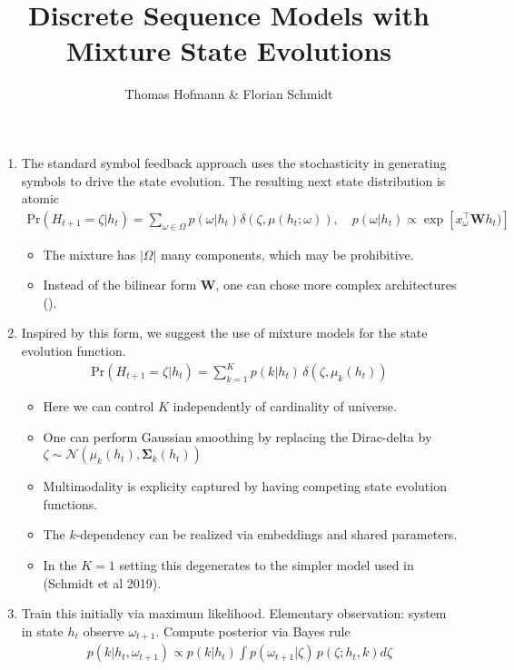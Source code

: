 \documentclass{article}
\author{Thomas Hofmann \& Florian Schmidt}
\title{Discrete Sequence Models with Mixture State Evolutions}
\newcommand{\mSigma}{{\mathbf \Sigma}}
\newcommand{\mW}{{\mathbf W}}
\begin{document}
\maketitle 
\begin{enumerate}
\item The standard symbol feedback approach uses the stochasticity in generating symbols to drive the state evolution. The resulting next state distribution is atomic 
\begin{align}
\text{Pr}(H_{t+1} =\zeta | h_t) = \sum_{\omega \in \Omega} p(\omega|h_t) \delta(\zeta, \mu(h_t; \omega)), \quad p(\omega|h_t) \propto \exp\left[ x_\omega^\top \mW h_t) \right]
\end{align}
\begin{itemize}
\item The mixture has $| \Omega|$ many components, which may be prohibitive. 
\item Instead of the bilinear form $\mW$, one can chose more complex architectures (\cite{graves2013generating}).
\end{itemize}
\item Inspired by this form, we suggest the use of mixture models for the state evolution function. 
\begin{align}
\text{Pr}(H_{t+1} = \zeta | h_t) = \sum_{k=1}^K p(k \vert h_t) \, \delta(\zeta, \mu_k(h_t))
\end{align}
\begin{itemize}
\item Here we can control $K$ independently of cardinality of universe. 
\item One can perform Gaussian smoothing by replacing the Dirac-delta by $\zeta \sim \mathcal N(\mu_k(h_t), \mSigma_k(h_t))$
\item Multimodality is explicity captured by having competing state evolution functions.
\item The $k$-dependency can be realized via embeddings and shared parameters.
\item In the $K=1$ setting this degenerates to the simpler model used in (Schmidt et al 2019).
\end{itemize}
\item Train this initially via maximum likelihood. Elementary observation: system in state $h_t$ observe $\omega_{t+1}$. Compute posterior via Bayes rule
\begin{align}
p(k | h_t, \omega_{t+1}) \propto   p(k|h_t) \int p(\omega_{t+1} \vert \zeta) \, p(\zeta; h_t, k) d\zeta 

\end{align}
\end{enumerate}
\end{document}

